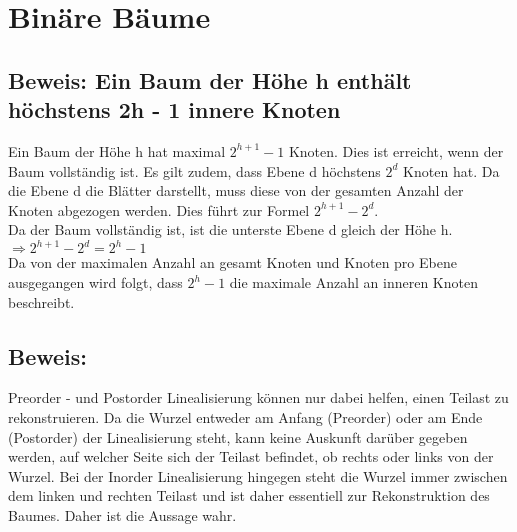 \section{Binäre Bäume}
\subsection{Beweis: Ein Baum der Höhe h enthält höchstens 2h - 1 innere Knoten}
Ein Baum der Höhe h hat maximal $2^{h+1}-1$ Knoten. Dies ist erreicht, wenn der Baum vollständig ist. Es gilt zudem, dass Ebene d höchstens $2^d$ Knoten hat. Da die Ebene d die Blätter darstellt, muss diese von der gesamten Anzahl der Knoten abgezogen werden. Dies führt zur Formel $2^{h+1}-2^d$.\\Da der Baum vollständig ist, ist die unterste Ebene d gleich der Höhe h.\\
$\Rightarrow 2^{h+1}-2^d=2^{h}-1$\\
Da von der maximalen Anzahl an gesamt Knoten und Knoten pro Ebene ausgegangen wird folgt, dass $2^{h}-1$ die maximale Anzahl an inneren Knoten beschreibt.
\subsection{Beweis: }
Preorder - und Postorder Linealisierung können nur dabei helfen, einen Teilast zu rekonstruieren. Da die Wurzel entweder am Anfang (Preorder) oder am Ende (Postorder) der Linealisierung steht, kann keine Auskunft darüber gegeben werden, auf welcher Seite sich der Teilast befindet, ob rechts oder links von der Wurzel. Bei der Inorder Linealisierung hingegen steht die Wurzel immer zwischen dem linken und rechten Teilast und ist daher essentiell zur Rekonstruktion des Baumes. Daher ist die Aussage wahr.